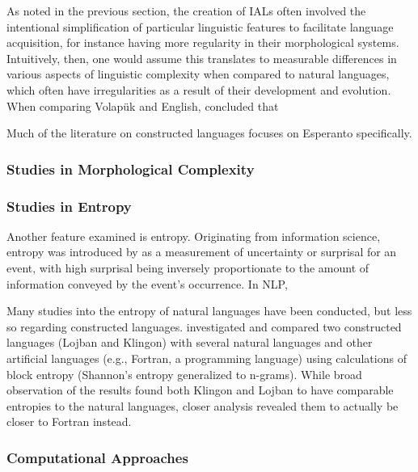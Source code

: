 \documentclass[12pt,a4paper]{article}
\numberwithin{figure}{section}
\numberwithin{table}{section}
\numberwithin{definition}{section}
\begin{document}
As noted in the previous section, the creation of IALs often involved the intentional simplification of particular linguistic features to facilitate language acquisition, for instance having more regularity in their morphological systems. Intuitively, then, one would assume this translates to measurable differences in various aspects of linguistic complexity when compared to natural languages, which often have irregularities as a result of their development and evolution. When comparing Volapük and English, \textcite{Gobbo2016article} concluded that

Much of the literature on constructed languages focuses on Esperanto specifically.

\subsubsection{Studies in Morphological Complexity}
\label{morphologicalcomplexitystudies}

\subsubsection{Studies in Entropy}
\label{entropystudies}

Another feature examined is entropy. Originating from information science, entropy was introduced by \textcite{Shannon1948book} as a measurement of uncertainty or surprisal for an event, with high surprisal being inversely proportionate to the amount of information conveyed by the event's occurrence. In NLP, 

Many studies into the entropy of natural languages have been conducted, but less so regarding constructed languages. \textcite{Smaha2015book} investigated and compared two constructed languages (Lojban and Klingon) with several natural languages and other artificial languages (e.g., Fortran, a programming language) using calculations of block entropy (Shannon's entropy generalized to n-grams). While broad observation of the results found both Klingon and Lojban to have comparable entropies to the natural languages, closer analysis revealed them to actually be closer to Fortran instead. 

\subsubsection{Computational Approaches}
\label{ssec:computationalapproaches}

\textcite{Oktafiani2024article} 
\end{document}
